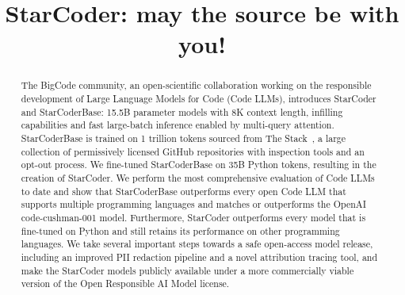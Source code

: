 \documentclass[10pt]{article} %
\title{\emojidizzy StarCoder: may the source be with you! }
\begin{document}
\maketitle
\vspace{-6.5em}


\begin{abstract}
The BigCode community, an open-scientific collaboration working on the responsible development of Large Language Models for Code (Code LLMs), introduces StarCoder and StarCoderBase: 15.5B parameter models with 8K context length, infilling capabilities and fast large-batch inference enabled by multi-query attention. StarCoderBase is trained on 1 trillion tokens sourced from The Stack~\citep{Kocetkov2022TheStack}, a large collection of permissively licensed GitHub repositories with inspection tools and an opt-out process. We fine-tuned StarCoderBase on 35B Python tokens, resulting in the creation of StarCoder. We perform the most comprehensive evaluation of Code LLMs to date and show that StarCoderBase outperforms every open Code LLM that supports multiple programming languages and matches or outperforms the OpenAI code-cushman-001 model. 
Furthermore, StarCoder outperforms every model that is fine-tuned on Python
and still retains its performance on other programming languages.
We take several important steps towards a safe open-access model release, including an improved PII redaction pipeline and a novel attribution tracing tool, and make the StarCoder models publicly available under a more commercially viable version of the Open Responsible AI Model license. 
\end{abstract}

\end{document}
